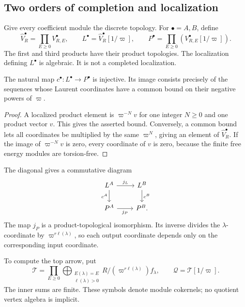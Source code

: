 \subsection{Two orders of completion and localization}

Give every coefficient module the discrete topology.  For
\(\bullet=A,B\), define
\begin{equation}\label{rc:eq:three-carriers}
 \widehat V_R^\bullet=\prod_{E\geq0}V_{R,E}^\bullet,\qquad
 L^\bullet=\widehat V_R^\bullet[1/\varpi],\qquad
 P^\bullet=\prod_{E\geq0}(V_{R,E}^\bullet[1/\varpi]).
\end{equation}
The first and third products have their product topologies.
The localization defining \(L^\bullet\) is algebraic.
It is not a completed localization.

\begin{lemma}\label{rc:lem:denominators}
The natural map \(c^\bullet:L^\bullet\to P^\bullet\) is injective.
Its image consists precisely of the sequences whose Laurent
coordinates have a common bound on their negative powers of
\(\varpi\).
\end{lemma}
\begin{proof}
A localized product element is \(\varpi^{-N}v\) for one integer
\(N\geq0\) and one product vector \(v\).  This gives the asserted
bound.  Conversely, a common bound lets all coordinates be
multiplied by the same \(\varpi^N\), giving an element of
\(\widehat V_R^\bullet\).  If the image of
\(\varpi^{-N}v\) is zero, every coordinate of \(v\) is zero,
because the finite free energy modules are torsion-free.
\end{proof}

The diagonal gives a commutative diagram
\begin{equation}\label{rc:eq:comparison-square}
\begin{tikzcd}
 L^A \arrow[r,"j_L"] \arrow[d,"c^A"']&
 L^B \arrow[d,"c^B"]\\
 P^A \arrow[r,"j_P"']&P^B.
\end{tikzcd}
\end{equation}
The map \(j_P\) is a product-topological isomorphism.  Its inverse
divides the \(\lambda\)-coordinate by
\(\varpi^{r\ell(\lambda)}\), so each output coordinate depends
only on the corresponding input coordinate.

To compute the top arrow, put
\begin{equation}\label{rc:eq:product-cokernel}
 \mathcal T=
 \prod_{E\geq0}
 \bigoplus_{\substack{E(\lambda)=E\\\ell(\lambda)>0}}
       R/(\varpi^{r\ell(\lambda)})f_\lambda,\qquad
 \mathcal Q=\mathcal T[1/\varpi].
\end{equation}
The inner sums are finite.  These symbols denote module
cokernels; no quotient vertex algebra is implicit.

